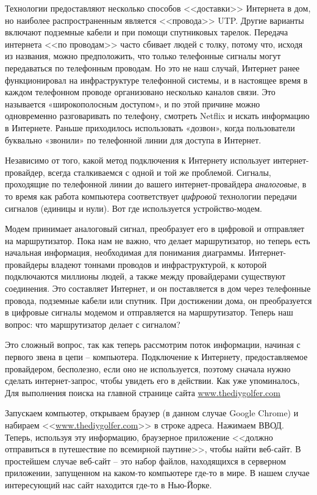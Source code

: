 \documentclass[12pt]{article}
\begin{document}
Технологии предоставляют несколько способов <<доставки>> Интернета в дом,
но наиболее распространенным является <<провода>> UTP. Другие варианты
включают подземные кабели и при помощи спутниковых тарелок. Передача интернета <<по
проводам>> часто сбивает людей с толку, потому что, исходя из названия,
можно предположить, что только телефонные сигналы могут передаваться по
телефонным проводам. Но это не наш случай, Интернет ранее функционировал
на инфраструктуре телефонной системы, и в настоящее время в каждом
телефонном проводе организовано несколько каналов связи. Это называется
«широкополосным доступом», и по этой причине можно одновременно
разговаривать по телефону, смотреть Netflix и искать информацию в
Интернете. Раньше приходилось использовать «дозвон», когда пользователи
буквально «звонили» по телефонной линии для доступа в Интернет.

Независимо от того, какой метод подключения к Интернету использует
интернет-провайдер, всегда сталкиваемся с одной и той же проблемой.
Сигналы, проходящие по телефонной линии до вашего интернет-провайдера
\emph{аналоговые}, в то время как работа компьютера соответствует
\emph{цифровой} технологии передачи сигналов (единицы и нули). Вот где
используется устройство-модем.

Модем принимает аналоговый сигнал, преобразует его в цифровой и
отправляет на маршрутизатор. Пока нам не важно, что делает
маршрутизатор, но теперь есть начальная информация, необходимая для
понимания диаграммы. Интернет-провайдеры владеют тоннами проводов и
инфраструктурой, к которой подключаются миллионы людей, а также между
провайдерами существуют соединения. Это составляет Интернет, и он
поставляется в дом через телефонные провода, подземные кабели или
спутник. При достижении дома, он преобразуется в цифровые сигналы модемом
и отправляется на маршрутизатор. Теперь наш вопрос: что маршрутизатор
делает с сигналом?

Это сложный вопрос, так как теперь рассмотрим поток информации, начиная
с первого звена в цепи -- компьютера. Подключение к Интернету,
предоставляемое провайдером, бесполезно, если оно не используется,
поэтому сначала нужно сделать интернет-запрос, чтобы увидеть его в
действии. Как уже упоминалось, Для выполнения поиска на главной странице
сайта \href{http://www.thediygolfer.com}{www.thediygolfer.com}

Запускаем компьютер, открываем браузер (в данном случае Google Chrome) и
набираем <<\href{http://www.thediygolfer.com}{www.thediygolfer.com}>> в
строке адреса. Нажимаем ВВОД. Теперь, используя эту информацию,
браузерное приложение <<должно отправиться в путешествие по всемирной
паутине>>, чтобы найти веб-сайт. В простейшем случае веб-сайт -- это набор файлов, находящихся
в серверном приложении, запущенном на каком-то компьютере где-то в мире.
В нашем случае интересующий нас сайт находится где-то в Нью-Йорке.
\end{document}
